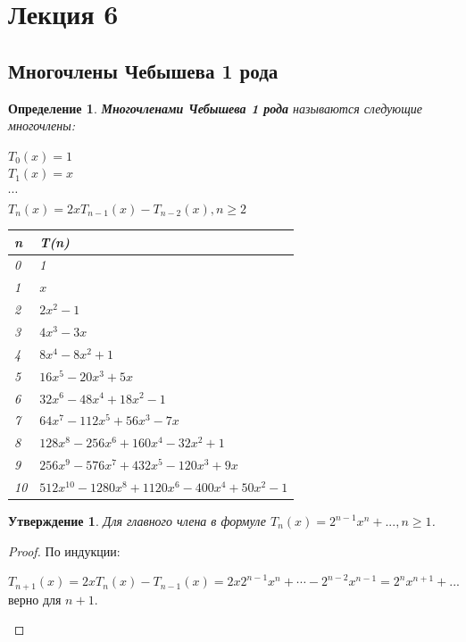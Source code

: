 \documentclass[12pt]{article}
\newtheorem*{definition}{Определение}
\newtheorem*{statement}{Утверждение}
\begin{document}
	\newpage
	\section{Лекция 6}
	\subsection{Многочлены Чебышева 1 рода}
	\begin{definition}\textbf{Многочленами Чебышева 1 рода}  называются следующие многочлены:
	\begin{center}
		$T_0(x) = 1$ \\
		$T_1(x) = x$\\
		$\cdots$\\
		$T_n(x) = 2xT_{n-1}(x)-T_{n-2}(x), n\geqslant 2$
	\end{center} 
	\begin{center}
		\begin{tabular}{|l|l|}
			\hline
			\textbf{n} & \textbf{T(n)} \\ \hline
			0 & 1 \\ \hline
			1 & $x$ \\ \hline
			2 & $2x^2-1$ \\ \hline
			3 & $4x^3-3x$ \\ \hline
			4 & $8x^4-8x^2+1$ \\ \hline
			5 & $16x^5-20x^3+5x$ \\ \hline
			6 & $32x^6-48x^4+18x^2-1$ \\ \hline
			7 & $64x^7-112x^5+56x^3-7x$ \\ \hline
			8 & $128x^8-256x^6+160x^4-32x^2+1$ \\ \hline
			9 & $256x^9-576x^7+432x^5-120x^3+9x$ \\ \hline
			10 & $512x^{10}-1280x^8+1120x^6-400x^4+50x^2-1$ \\ \hline
		\end{tabular}
	\end{center}
	\end{definition}
	\begin{statement}
	Для главного члена в формуле $T_n(x)=2^{n-1}x^n+..., n\geqslant 1$.
	\end{statement}
	\begin{proof} По индукции:\begin{center}
		$T_{n+1}(x)=2xT_n(x)-T_{n-1}(x)=2x2^{n-1}x^n+\cdots-2^{n-2}x^{n-1}=2^nx^{n+1}+...$ верно для $n+1. $\end{center}
	\end{proof}
\end{document}
